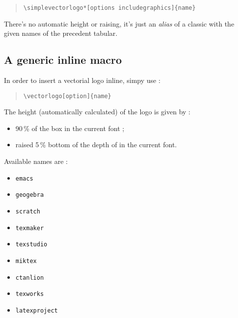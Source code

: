 \documentclass[11pt,a4paper]{ltxdoc}
\begin{document}
\begin{quote}
\begin{verbatim}
\simplevectorlogo*[options includegraphics]{name}
\end{verbatim}
\end{quote}

There's no automatic height or raising, it's just an \textit{alias} of a classic  with the given names of the precedent tabular.

\begin{tcblisting}{}
\par
{}\par
{}\par
{}\par
{}\par
{}\par
{}
\end{tcblisting}

\pagebreak

\subsection{A generic inline macro}

In order to insert a vectorial logo inline, simpy use :

\begin{quote}
\begin{verbatim}
\vectorlogo[option]{name}
\end{verbatim}
\end{quote}

The height (automatically calculated) of the logo is given by :

\begin{itemize}
	\item 90\,\% of the box  in the current font ;
	\item raised 5\,\% bottom of the depth of  in the current font.
\end{itemize}

Available \textsf{names} are :

\begin{multicols}{3}
	\begin{itemize}
		\item \texttt{emacs}
		\item \texttt{geogebra}
		\item \texttt{scratch}
		\item \texttt{texmaker}
		\item \texttt{texstudio}
		\item \texttt{miktex}
		\item \texttt{ctanlion}
		\item \texttt{texworks}
		\item \texttt{latexproject}
	\end{itemize}
\end{multicols}
\end{document}
